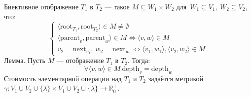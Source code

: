 Биективное {\ital отображение} $T_1$ в $T_2$ --- такое $M\subseteq W_1\times W_2$ для~$W_1\subseteq V_1,\ W_2\subseteq V_2$, что:
$$\begin{cases}
\langle\text{root}_{T_1},\text{root}_{T_2}\rangle\in M\neq\emptyset\\
\langle\text{parent}_v,\text{parent}_w\rangle\in M\iff\langle v,w\rangle\in M\\
v_2=\text{next}_{v_1},\ w_2=\text{next}_{w_1}\iff\langle v_1,w_1\rangle,\langle v_2,w_2\rangle\in M
\end{cases}$$
{\ital Лемма.} Пусть $M$ --- отображение $T_1$ в $T_2$. Тогда:
$$\forall\langle v,w\rangle\in M\ \text{depth}_v=\text{depth}_w$$
{\ital Стоимость} элементарной операции над $T_1$ и $T_2$ задаётся метрикой $\gamma\colon V_1\cup V_2\cup\{\lambda\}\times V_1\cup V_2\cup\{\lambda\}\to\mathbb{R}^+_0$.

